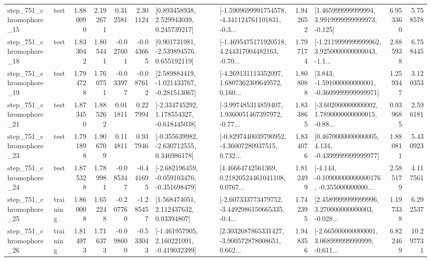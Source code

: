 \begin{tabular}{llrrrrllrlrr}
  step\_751\_chromophore\_15 &      test &      1.880090 &    2.192671 &      0.312581 &  2.301124 &     [0.893458938, 2.529943039, 0.245739217] &  [-1.5909699991754578, -4.341124761101831, -0.3... &       1.942652 &    [1.465999999999994, 3.9919999999999973, -0.125] &            6.953360 &          5.758578 \\
  step\_751\_chromophore\_18 &      test &      1.833042 &    1.805441 &     -0.027601 & -0.043665 &    [0.901731981, -2.539894576, 0.655192119] &  [-1.4695475171920518, 4.244317004482163, -0.70... &       1.797174 &  [-1.2119999999999962, 3.9250000000000043, -1.1... &            2.885938 &          6.758445 \\
  step\_751\_chromophore\_19 &      test &      1.794728 &    1.760751 &     -0.033977 & -0.087612 &   [2.589884419, -1.021433767, -0.281513067] &  [-4.269131113352097, 1.6807362309649572, 0.160... &       1.808088 &   [3.843, -1.591000000000001, -0.3609999999999971] &            1.259347 &          3.120353 \\
  step\_751\_chromophore\_21 &      test &      1.873450 &    1.885262 &      0.011811 &  0.227994 &   [-2.334745292, 1.178554327, -0.618445038] &  [-3.997485314859407, 1.9360051467397972, -0.77... &       1.833865 &  [-3.602000000000002, 1.7890000000000015, -0.88... &            0.939685 &          2.596181 \\
  step\_751\_chromophore\_23 &      test &      1.791898 &    1.906709 &      0.114811 &  0.937946 &   [-0.355639982, -2.630712555, 0.346986178] &  [-0.8297440039790952, -4.36007280937515, 0.732... &       1.834076 &   [0.4670000000000005, 4.134, -0.4399999999999977] &            1.880811 &          5.430923 \\
  step\_751\_chromophore\_24 &      test &      1.875328 &    1.789981 &     -0.085347 & -0.441695 &  [-2.682196459, -0.059103476, -0.351698479] &  [4.46664742561369, 0.21820524461041108, 0.0767... &       1.812499 &  [-4.144, -0.10900000000000176, -0.355000000000... &            2.585179 &          4.117561 \\
  step\_751\_chromophore\_25 &  training &      1.860008 &    1.652248 &     -0.207760 & -1.285457 &      [1.568474051, 2.112437632, 0.03394807] &  [-2.607333773479752, -3.4492986150665335, -0.4... &       1.742395 &  [2.4589999999999996, 3.270000000000003, -0.028... &            1.197338 &          6.292537 \\
  step\_751\_chromophore\_26 &  training &      1.814973 &    1.716373 &     -0.098600 & -0.533043 &   [-1.461957905, 2.160221091, -0.419032399] &  [2.3032687865331427, -3.900572878008651, 0.662... &       1.948356 &  [-2.665000000000001, 3.068999999999999, -0.611... &            6.822469 &         10.297731 \\

\end{tabular}
